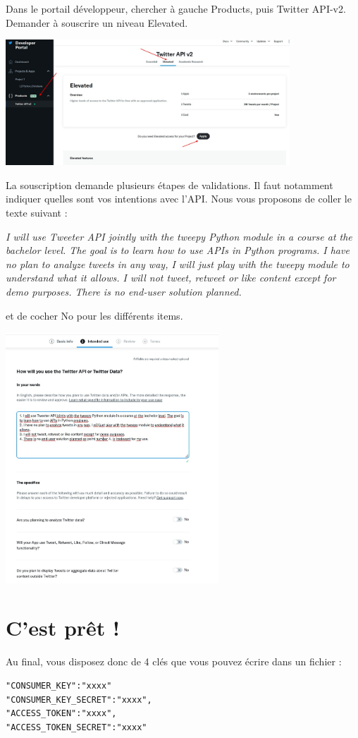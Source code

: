 \documentclass[11pt,a4paper]{article}
\begin{document}
Dans le portail développeur, chercher à gauche Products, puis Twitter API-v2. Demander à souscrire un niveau Elevated. 

\begin{center}
    \includegraphics[width=0.8\textwidth]{etapes_cle/step6.jpg}
\end{center}

La souscription demande plusieurs étapes de validations. Il faut notamment indiquer quelles sont vos intentions avec l'API. Nous vous proposons de coller le texte suivant : 

\emph{
I will use Tweeter API jointly with the tweepy Python module in a course at the bachelor level. The goal is to learn how to use APIs in Python programs. I have no plan to analyze tweets in any way, I will just play with the tweepy module to understand what it allows.
I will not tweet, retweet or like content except for demo purposes. There is no end-user solution planned.
}

et de cocher No pour les différents items. 

\begin{center}
    \includegraphics[width=0.6\textwidth]{etapes_cle/step7.jpg}
\end{center}

\section{C'est prêt !}
Au final, vous disposez donc de 4 clés que vous pouvez écrire dans un fichier :
\begin{verbatim}
"CONSUMER_KEY":"xxxx"
"CONSUMER_KEY_SECRET":"xxxx",
"ACCESS_TOKEN":"xxxx",
"ACCESS_TOKEN_SECRET":"xxxx"
\end{verbatim}
\end{document}
